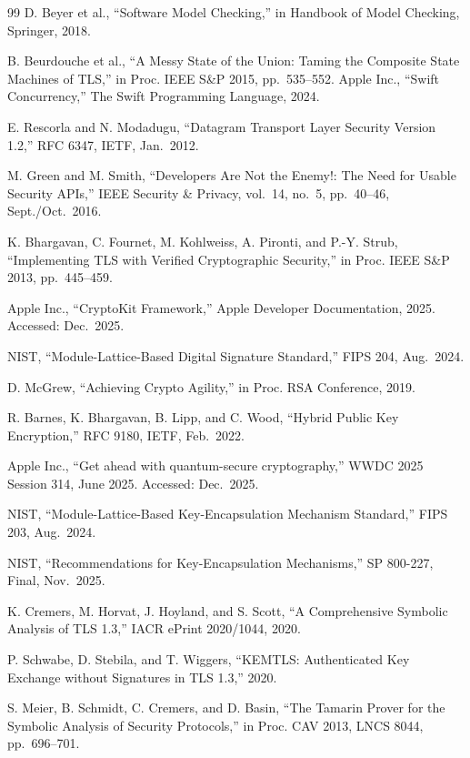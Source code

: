 \documentclass[10pt,journal,compsoc]{IEEEtran}
\begin{document}
\begin{thebibliography}{99}
 D. Beyer et al., ``Software Model Checking,'' in Handbook of Model Checking, Springer, 2018.

 B. Beurdouche et al., ``A Messy State of the Union: Taming the Composite State Machines of TLS,'' in Proc. IEEE S\&P 2015, pp.~535--552.
 Apple Inc., ``Swift Concurrency,'' The Swift Programming Language, 2024.

 E. Rescorla and N. Modadugu, ``Datagram Transport Layer Security Version 1.2,'' RFC 6347, IETF, Jan.~2012.

 M. Green and M. Smith, ``Developers Are Not the Enemy!: The Need for Usable Security APIs,'' IEEE Security \& Privacy, vol.~14, no.~5, pp.~40--46, Sept./Oct.~2016.

 K. Bhargavan, C. Fournet, M. Kohlweiss, A. Pironti, and P.-Y. Strub, ``Implementing TLS with Verified Cryptographic Security,'' in Proc. IEEE S\&P 2013, pp.~445--459.

 Apple Inc., ``CryptoKit Framework,'' Apple Developer Documentation, 2025. Accessed: Dec.~2025.

 NIST, ``Module-Lattice-Based Digital Signature Standard,'' FIPS 204, Aug.~2024.

 D. McGrew, ``Achieving Crypto Agility,'' in Proc. RSA Conference, 2019.

 R. Barnes, K. Bhargavan, B. Lipp, and C. Wood, ``Hybrid Public Key Encryption,'' RFC 9180, IETF, Feb.~2022.

 Apple Inc., ``Get ahead with quantum-secure cryptography,'' WWDC 2025 Session 314, June 2025. Accessed: Dec.~2025.

 NIST, ``Module-Lattice-Based Key-Encapsulation Mechanism Standard,'' FIPS 203, Aug.~2024.

 NIST, ``Recommendations for Key-Encapsulation Mechanisms,'' SP 800-227, Final, Nov.~2025.

 K. Cremers, M. Horvat, J. Hoyland, and S. Scott, ``A Comprehensive Symbolic Analysis of TLS 1.3,'' IACR ePrint 2020/1044, 2020.

 P. Schwabe, D. Stebila, and T. Wiggers, ``KEMTLS: Authenticated Key Exchange without Signatures in TLS 1.3,'' 2020.

 S. Meier, B. Schmidt, C. Cremers, and D. Basin, ``The Tamarin Prover for the Symbolic Analysis of Security Protocols,'' in Proc. CAV 2013, LNCS 8044, pp.~696--701.


\end{thebibliography}
\end{document}
